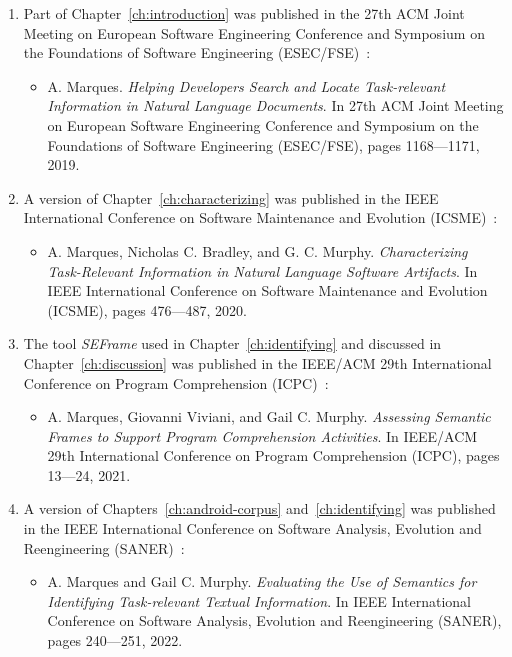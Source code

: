 \begin{enumerate}
    \item Part of Chapter~\ref{ch:introduction} was published in the 27th ACM Joint Meeting on European Software Engineering Conference and Symposium on the Foundations of Software Engineering (ESEC/FSE)~\cite{marques2019}:


    \begin{itemize}
        \item A. Marques.
            \textit{Helping Developers Search and Locate Task-relevant Information in Natural Language Documents}. 
            In 27th ACM Joint Meeting on European Software Engineering Conference and Symposium on the Foundations of Software Engineering (ESEC/FSE),
            pages 1168---1171, 2019.
    \end{itemize}        


\item A version of Chapter~\ref{ch:characterizing} was published in the IEEE  International Conference on Software Maintenance and Evolution (ICSME)~\cite{marques2020}:


    \begin{itemize}
        \item A. Marques, Nicholas C. Bradley, and G. C. Murphy.
            \textit{Characterizing Task-Relevant Information in Natural Language Software Artifacts}. 
            In IEEE  International Conference on Software Maintenance and Evolution (ICSME),
            pages 476---487, 2020. 
    \end{itemize}

\item The tool \textit{SEFrame} used in Chapter~\ref{ch:identifying} and discussed in Chapter~\ref{ch:discussion} was published in the  IEEE/ACM 29th International Conference on Program Comprehension (ICPC)~\cite{marques2021}:


    \begin{itemize}
        \item A. Marques, Giovanni Viviani, and Gail C. Murphy.
            \textit{Assessing Semantic Frames to Support Program Comprehension Activities}. 
            In IEEE/ACM 29th International Conference on Program Comprehension (ICPC), 
            pages 13---24, 2021.
    \end{itemize}


\item A version of Chapters~\ref{ch:android-corpus} and~\ref{ch:identifying} was published in the IEEE International Conference on Software Analysis, Evolution and Reengineering (SANER)~\cite{marques2022}: 


    \begin{itemize}
        \item A. Marques and Gail C. Murphy. 
            \textit{Evaluating the Use of Semantics for Identifying Task-relevant Textual Information}. 
            In IEEE International Conference on Software Analysis, Evolution and Reengineering (SANER),
            pages 240---251, 2022.
    \end{itemize}

\end{enumerate}



